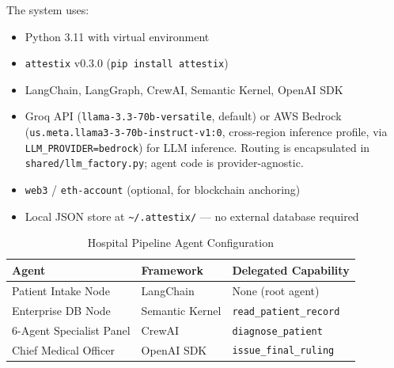 The system uses:
\begin{itemize}
    \item Python 3.11 with virtual environment
    \item \texttt{attestix} v0.3.0 (\texttt{pip install attestix})
    \item LangChain, LangGraph, CrewAI, Semantic Kernel, OpenAI SDK
    \item Groq API (\texttt{llama-3.3-70b-versatile}, default) or AWS Bedrock (\texttt{us.meta.llama3-3-70b-instruct-v1:0}, cross-region inference profile, via \texttt{LLM\_PROVIDER=bedrock}) for LLM inference. Routing is encapsulated in \texttt{shared/llm\_factory.py}; agent code is provider-agnostic.
    \item \texttt{web3} / \texttt{eth-account} (optional, for blockchain anchoring)
    \item Local JSON store at \texttt{\textasciitilde/.attestix/} --- no external database required
\end{itemize}

\begin{table}[H]
\centering
\caption{Hospital Pipeline Agent Configuration}
\label{tab:hospital_config}
\begin{tabularx}{\textwidth}{|l|l|X|}
\hline
\textbf{Agent} & \textbf{Framework} & \textbf{Delegated Capability} \\
\hline
Patient Intake Node & LangChain & None (root agent) \\
Enterprise DB Node & Semantic Kernel & \texttt{read\_patient\_record} \\
6-Agent Specialist Panel & CrewAI & \texttt{diagnose\_patient} \\
Chief Medical Officer & OpenAI SDK & \texttt{issue\_final\_ruling} \\
\hline
\end{tabularx}
\end{table}

